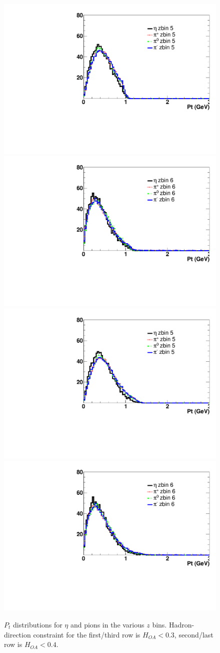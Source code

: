 \begin{figure}[H]
\includegraphics[width=.27\textwidth,natwidth=250,natheight=100]{figure_fiducial/had0.3_z0.3/Pt_distri_for_zbin_5_norm_had03z03.pdf}
\includegraphics[width=.27\textwidth,natwidth=250,natheight=100]{figure_fiducial/had0.3_z0.3/Pt_distri_for_zbin_6_norm_had03z03.pdf}\hfill\\
\includegraphics[width=.27\textwidth,natwidth=250,natheight=100]{figure_fiducial/had0.4_z0.3/Pt_distri_for_zbin_5_norm_had04z03.pdf}
\includegraphics[width=.27\textwidth,natwidth=250,natheight=100]{figure_fiducial/had0.4_z0.3/Pt_distri_for_zbin_6_norm_had04z03.pdf}\hfill
\caption[$P_t$ distributions for $\eta$ and pions in the various $z$ bins]{$P_t$ distributions for $\eta$ and pions in the various $z$ bins. Hadron-direction constraint for the first/third row is $H_{OA}<0.3$, second/last row is $H_{OA}<0.4$.}
\end{figure}

